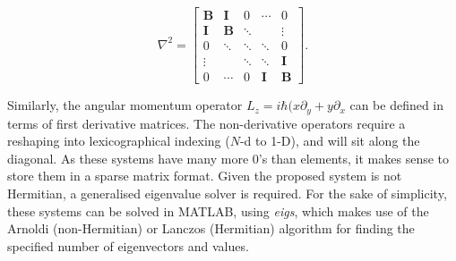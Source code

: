 \begin{equation}
    \nabla^2=
    \begin{bmatrix}
        \mathbf{B}    & \mathbf{I} &      0      &  \cdots      &      0       \\
        \mathbf{I}    & \mathbf{B} &  \ddots     &              &  \vdots      \\
        0             & \ddots     &  \ddots     &  \ddots      &      0       \\
        \vdots        &            &  \ddots     &  \ddots      &  \mathbf{I}  \\
        0             & \cdots     &      0      &  \mathbf{I}  &  \mathbf{B}
    \end{bmatrix}.
\end{equation}

Similarly, the angular momentum operator $L_z = i\hbar(x\partial_y + y\partial_x$ can be defined in terms of first derivative matrices. The non-derivative operators require a reshaping into lexicographical indexing ($N$-d to 1-D), and will sit along the diagonal. As these systems have many more 0's than elements, it makes sense to store them in a sparse matrix format. Given the proposed system is not Hermitian, a generalised eigenvalue solver is required. For the sake of simplicity, these systems can be solved in MATLAB, using \textit{eigs}, which makes use of the Arnoldi (non-Hermitian) or Lanczos (Hermitian) algorithm for finding the specified number of eigenvectors and values.
